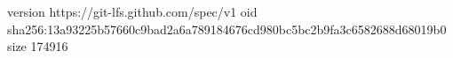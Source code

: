 version https://git-lfs.github.com/spec/v1
oid sha256:13a93225b57660c9bad2a6a789184676cd980bc5bc2b9fa3c6582688d68019b0
size 174916
